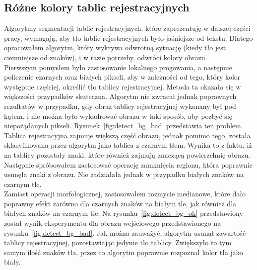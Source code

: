 \subsection{Różne kolory tablic rejestracyjnych}\label{ssec:different_backgrounds}
Algorytmy segmentacji tablic rejestracyjnych, które zaprezentuję w dalszej części pracy, wymagają, aby tło tablic rejestracyjnych było jaśniejsze od tekstu. Dlatego opracowałem algorytm, który wykrywa odwrotną sytuację (kiedy tło jest ciemniejsze od znaków), i w razie potrzeby, odwróci kolory obrazu.\\
Pierwszym pomysłem było zastosowanie lokalnego progowania, a następnie policzenie czarnych oraz białych pikseli, aby w zależności od tego, który kolor występuje częściej, określić tło tablicy rejestracyjnej. Metoda ta okazała się w większości przypadków skuteczna. Algorytm nie zwracał jednak poprawnych rezultatów w przypadku, gdy obraz tablicy rejestracyjnej wykonany był pod kątem, i nie można było wykadrować obrazu w taki sposób, aby pozbyć się niepożądanych pikseli. Rysunek~\ref{fig:detect_bg_bad} przedstawia ten problem. Tablica rejestracyjna zajmuje większą część obrazu, jednak pomimo tego, została sklasyfikowana przez algorytm jako tablica z czarnym tłem. Wynika to z faktu, iż na tablicy pozostały znaki, które również zajmują znaczącą powierzchnię obrazu. Następnie spróbowałem zastosować operację zamknięcia regionu, która poprawnie usunęła znaki z obrazu. Nie zadziałała jednak w przypadku białych znaków na czarnym tle. \\
Zamiast operacji morfologicznej, zastosowałem rozmycie medianowe, które dało poprawny efekt zarówno dla czarnych znaków na białym tle, jak również dla białych znaków na czarnym tle. Na rysunku~\ref{fig:detect_bg_ok} przedstawiony został wynik eksperymentu dla obrazu wejściowego przedstawionego na rysunku~\ref{fig:detect_bg_bad}. Jak można zauważyć, algorytm usunął zawartość tablicy rejestracyjnej, pozostawiając jedynie tło tablicy. Zwiększyło to tym samym ilość znaków tła, przez co algorytm poprawnie rozpoznał kolor tła jako biały.

